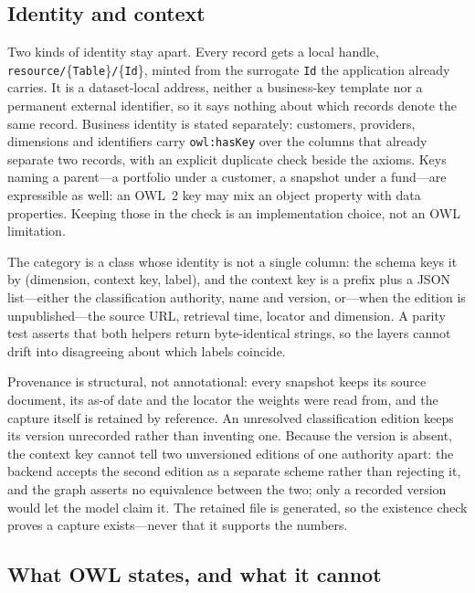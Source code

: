 

\subsection{Identity and context}

Two kinds of identity stay apart. Every record gets a local handle,
\texttt{resource/}\{\texttt{Table}\}\texttt{/}\{\texttt{Id}\}, minted from the surrogate \texttt{Id} the
application already carries. It is a dataset-local address, neither a
business-key template nor a permanent external identifier, so it says nothing
about which records denote the same record. Business identity is stated separately:
customers, providers, dimensions and identifiers carry \texttt{owl:hasKey} over
the columns that already separate two records, with an explicit duplicate check
beside the axioms. Keys naming a parent---a portfolio under a customer, a
snapshot under a fund---are expressible as well: an OWL~2 key may mix an
object property with data properties. Keeping those in the check is an
implementation choice, not an OWL limitation.

The category is a class whose identity is not a single column: the schema
keys it by (dimension, context key, label), and the context key is a prefix plus
a JSON list---either the classification authority, name and version, or---when
the edition is unpublished---the source URL, retrieval time, locator and
dimension. A parity test asserts that both helpers return byte-identical
strings, so the layers cannot drift into disagreeing about which labels coincide.

Provenance is structural, not annotational: every snapshot keeps its source
document, its as-of date and the locator the weights were read from, and the
capture itself is retained by reference. An unresolved classification edition
keeps its version unrecorded rather than inventing one. Because the version is
absent, the context key cannot tell two unversioned editions of one authority
apart: the backend accepts the second edition as a separate scheme rather than
rejecting it, and the graph asserts no equivalence between the two; only a
recorded version would let the model claim it. The retained file is generated, so the
existence check proves a capture exists---never that it supports the numbers.

\subsection{What OWL states, and what it cannot}


